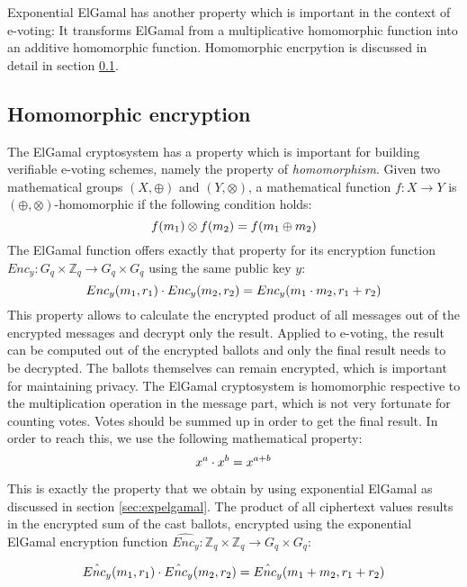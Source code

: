\documentclass[numbers=noenddot, abstract=on, a4paper, headsepline,
footsepline, oneside, draft=off]{scrreprt}
\begin{document}
Exponential ElGamal has another property which is important in the context of
e-voting: It transforms ElGamal from a multiplicative homomorphic function into
an additive homomorphic function. Homomorphic encrpytion is discussed in detail in
section \ref{sec:homenc}.

\subsection{Homomorphic encryption}
\label{sec:homenc}
The ElGamal cryptosystem has a property
which is important for building verifiable e-voting schemes, namely the property
of \emph{homomorphism}. Given two mathematical groups $(X,\oplus)$ and
$(Y,\otimes)$, a mathematical function $f:X \rightarrow Y$ is $(\oplus, \otimes)$-homomorphic if
the following condition holds:
\begin{equation}
f(m_1) \otimes f(m_2) = f(m_1 \oplus m_2) \notag
\end{equation}
The ElGamal function offers exactly that property for its encryption function
$Enc_y:G_q \times \mathbb{Z}_q \rightarrow G_q \times G_q$ using the same public key $y$:
\begin{equation}
Enc_y(m_1, r_1) \cdot Enc_y(m_2, r_2) = Enc_y(m_1 \cdot m_2, r_1 + r_2)
\notag
\end{equation}
This property allows to calculate the encrypted product of all messages out of
the encrypted messages and decrypt only the result. Applied to e-voting, the
result can be computed out of the encrypted ballots and only the final result
needs to be decrypted. The ballots themselves can remain encrypted, which is
important for maintaining privacy. The ElGamal cryptosystem is homomorphic
respective to the multiplication operation in the message part, which is not
very fortunate for counting votes. Votes should be summed up in order to get the
final result. In order to reach this, we use the following mathematical property:
\begin{equation}
x^a \cdot x^b = x^{a+b} \notag
\end{equation}

This is exactly the property that we obtain by using exponential ElGamal as
discussed in section \vref{sec:expelgamal}. The product of all ciphertext
values results in the encrypted sum of the cast ballots, encrypted using the
exponential ElGamal encryption function $\hat{Enc_y}:\mathbb{Z}_q \times
\mathbb{Z}_q \rightarrow G_q \times G_q$:

\begin{equation}
\hat{Enc_y}(m_1, r_1) \cdot \hat{Enc_y}(m_2, r_2) = \hat{Enc_y}(m_1 + m_2, r_1 +
r_2)
\notag
\end{equation}
\end{document}
